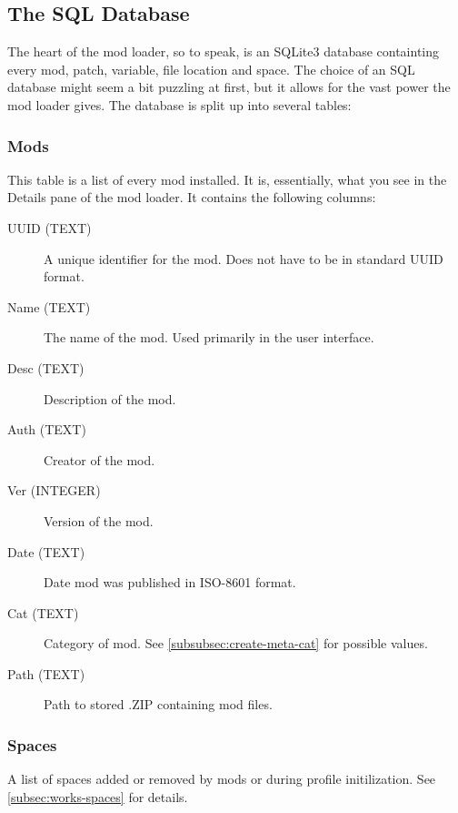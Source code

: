 
\subsection{The SQL Database}
The heart of the mod loader, so to speak, is an SQLite3 database containting every mod, patch, variable, file location and space. The choice of an SQL database might seem a bit puzzling at first, but it allows for the vast power the mod loader gives. The database is split up into several tables:

\subsubsection{Mods}
This table is a list of every mod installed. It is, essentially, what you see in the Details pane of the mod loader. It contains the following columns:

\begin{description}
\item[UUID (TEXT)] A unique identifier for the mod. Does not have to be in standard UUID format.
\item[Name (TEXT)] The name of the mod. Used primarily in the user interface.
\item[Desc (TEXT)] Description of the mod.	
\item[Auth (TEXT)] Creator of the mod.	
\item[Ver (INTEGER)] Version of the mod.
\item[Date (TEXT)] Date mod was published in ISO-8601 format.
\item[Cat (TEXT)] Category of mod. See \ref{subsubsec:create-meta-cat} for possible values.
\item[Path (TEXT)] Path to stored .ZIP containing mod files.
\end{description}

\subsubsection{Spaces}
A list of spaces added or removed by mods or during profile initilization. See \ref{subsec:works-spaces} for details.

